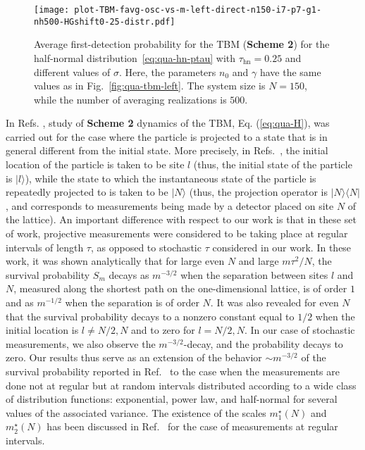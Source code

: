 \documentclass[12pt]{iopart}
\begin{document}
\begin{figure}[!htbp]
\centering
\texttt{[image: plot-TBM-favg-osc-vs-m-left-direct-n150-i7-p7-g1-nh500-HGshift0-25-distr.pdf]}
\caption{Average first-detection probability for the TBM (\textbf{Scheme 2}) for the half-normal distribution~\eqref{eq:qua-hn-ptau} with $\tau_{\mathrm{hn}} = 0.25$ and different values of $\sigma$.  Here, the parameters $n_0$ and $\gamma$ have the same values as in Fig.~\ref{fig:qua-tbm-left}.  The system size is $N=150$, while the number of averaging realizations is $500$. }
\label{fig:tbm-fm-osc}
\end{figure}
  
In Refs.  \cite{Dhar:2015,Dhar:2015-1,Lahiri:2019,Dubey:2021}, study of {\bf Scheme 2} dynamics of the TBM, Eq. (\ref{eq:qua-H}), was carried out for the case where the particle is projected to a state that is in general different from the initial state. More precisely,  in Refs.~\cite{Dhar:2015,Dhar:2015-1}, the initial location of the particle is taken to be site $l$ (thus, the initial state of the particle is $|l\rangle$), while the state to which the instantaneous state of the particle is repeatedly projected to is taken to be $|N\rangle$ (thus, the projection operator is $|N\rangle \langle N|$, and corresponds to measurements being made by a detector placed on site $N$ of the lattice).  An important difference with respect to our work is that in these set of work,  projective measurements were considered to be taking place at regular intervals of length $\tau$, as opposed to stochastic $\tau$ considered in our work.  In these work, it was shown analytically that for large even $N$ and large $m\tau^2/N$, the survival probability $S_m$ decays as $m^{-3/2}$ when the separation between sites $l$ and $N$, measured along the shortest path on the one-dimensional lattice,  is of order $1$ and as $m^{-1/2}$ when the separation is of order $N$. It was also revealed for even $N$ that the survival probability decays to a nonzero constant equal to $1/2$ when the initial location is $l \ne N/2,N$ and to zero for $l=N/2,N$.  In our case of stochastic measurements,  we also observe the $m^{-3/2}$-decay, and the probability decays to zero.  Our results thus serve as an extension of the behavior $\sim m^{-3/2}$ of the survival probability reported in Ref.~\cite{Dhar:2015}
to the case when the measurements are done not at regular but at random intervals distributed according to a wide class of distribution functions:  exponential, power law,  and half-normal for several values of the associated variance. The existence of the scales $m^{\star}_1(N)$ and $m^{\star}_2(N)$ has been discussed in Ref.~\cite{Lahiri:2019} for the case of measurements at regular intervals.
\end{document}
